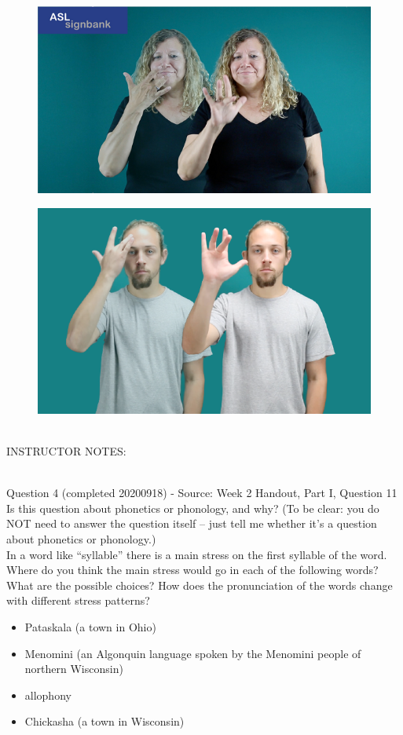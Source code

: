 \documentclass[12pt]{article}
\begin{document}
\begin{figure}[H]
\includegraphics{../images/asl_lucky.png}
\end{figure}
\begin{figure}[H]
\includegraphics{../images/asl_smart.png}
\end{figure}

~\\
INSTRUCTOR NOTES: 


~\\

{\large Question 4} (completed 20200918) - Source: Week 2 Handout, Part I, Question 11\\

Is this question about phonetics or phonology, and why? (To be clear: you do NOT need to answer the question itself -- just tell me whether it's a question about phonetics or phonology.)\\

In a word like ``syllable'' there is a main stress on the first syllable of the word. Where do you think the main stress would go in each of the following words? What are the possible choices? How does the pronunciation of the words change with different stress patterns? \begin{itemize} \item Pataskala (a town in Ohio) \item Menomini (an Algonquin language spoken by the Menomini people of northern Wisconsin) \item allophony \item Chickasha (a town in Wisconsin) \end{itemize}
\end{document}
